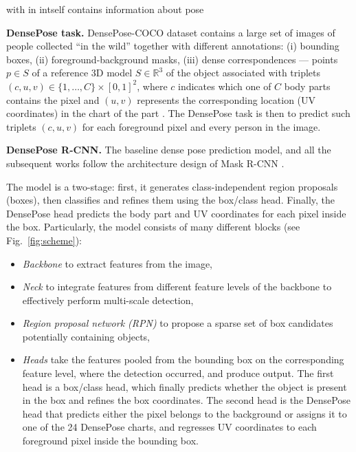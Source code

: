  with in intself contains information about pose


\noindent 
\textbf{DensePose task.} DensePose-COCO dataset contains a large set of images of people collected ``in the wild'' together with different annotations: (i) bounding boxes, (ii) foreground-background masks, (iii) dense correspondences --- points $p \in S$ of a reference 3D model $S\in\mathbb{R}^3$ of the object associated with triplets $(c, u, v) \in\{1, \ldots, C\} \times[0,1]^{2}$, where $c$ indicates which one of $C$ body parts contains the pixel and $(u,v)$ represents the corresponding location (UV coordinates) in the chart of the part \cite{smpl}.
The DensePose task is then to predict such triplets $(c, u, v)$ for each foreground pixel and every person in the image.
\newline

\noindent \textbf{DensePose R-CNN.} The baseline dense pose prediction model, and all the subsequent works \cite{parsing, uncertainty, monkeys} follow the architecture design of Mask R-CNN \cite{maskrcnn}.

The model is a two-stage: first, it generates class-independent region proposals (boxes), then classifies and refines them using the box/class head. Finally, the DensePose head predicts the body part and UV coordinates for each pixel inside the box. Particularly, the model consists of many different blocks (see Fig.~\ref{fig:scheme}):
\begin{itemize}
    \item \textit{Backbone} to extract features from the image,
    \item \textit{Neck} to integrate features from different feature levels of the backbone to effectively perform multi-scale detection,
    \item \textit{Region proposal network (RPN)} to propose a sparse set of box candidates potentially containing objects,
    \item \textit{Heads} take the features pooled from the bounding box on the corresponding feature level, where the detection occurred, and produce output. The first head is a box/class head, which finally predicts whether the object is present in the box and refines the box coordinates. The second head is the DensePose head that predicts either the pixel belongs to the background or assigns it to one of the 24 DensePose charts, and regresses UV coordinates to each foreground pixel inside the bounding box.
\end{itemize}

